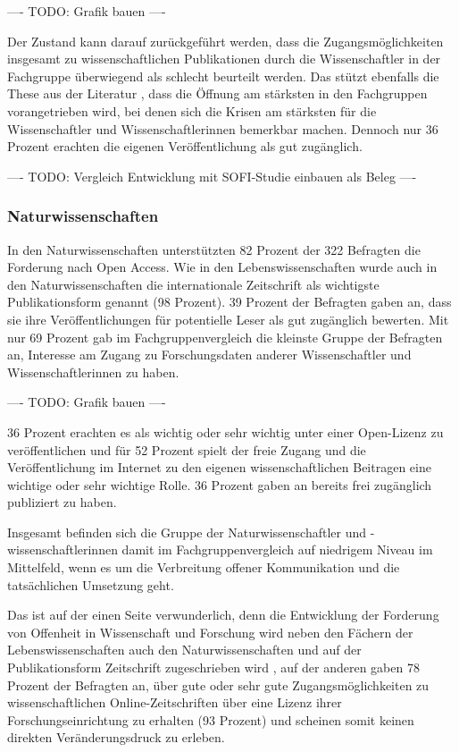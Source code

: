 ---- TODO: Grafik bauen  ----

Der Zustand kann darauf zurückgeführt werden, dass die Zugangsmöglichkeiten insgesamt zu wissenschaftlichen Publikationen durch die Wissenschaftler in der Fachgruppe überwiegend als schlecht beurteilt werden. Das stützt ebenfalls die These aus der Literatur \cite{suchen}, dass die Öffnung am stärksten in den Fachgruppen vorangetrieben wird, bei denen sich die Krisen am stärksten für die Wissenschaftler und Wissenschaftlerinnen bemerkbar machen. Dennoch nur 36 Prozent erachten die eigenen Veröffentlichung als gut zugänglich.

---- TODO: Vergleich Entwicklung mit SOFI-Studie einbauen als Beleg ----

\subsubsection{Naturwissenschaften}

In den Naturwissenschaften unterstützten 82 Prozent der 322 Befragten die Forderung nach Open Access. Wie in den Lebenswissenschaften wurde auch in den Naturwissenschaften die internationale Zeitschrift als wichtigste Publikationsform genannt (98 Prozent). 39 Prozent der Befragten gaben an, dass sie ihre Veröffentlichungen für potentielle Leser als gut zugänglich bewerten. Mit nur 69 Prozent gab im Fachgruppenvergleich die kleinste Gruppe der Befragten an, Interesse am Zugang zu Forschungsdaten anderer Wissenschaftler und Wissenschaftlerinnen zu haben.

---- TODO: Grafik bauen  ----

36 Prozent erachten es als wichtig oder sehr wichtig unter einer Open-Lizenz zu veröffentlichen und für 52 Prozent spielt der freie Zugang und die Veröffentlichung im Internet zu den eigenen wissenschaftlichen Beitragen eine wichtige oder sehr wichtige Rolle. 36 Prozent gaben an bereits frei zugänglich publiziert zu haben.

Insgesamt befinden sich die Gruppe der Naturwissenschaftler und -wissenschaftlerinnen damit im Fachgruppenvergleich auf niedrigem Niveau im Mittelfeld, wenn es um die Verbreitung offener Kommunikation und die tatsächlichen Umsetzung geht.

Das ist auf der einen Seite verwunderlich, denn die Entwicklung der Forderung von Offenheit in Wissenschaft und Forschung wird neben den Fächern der Lebenswissenschaften auch den Naturwissenschaften und auf der Publikationsform Zeitschrift zugeschrieben wird \cite{suchen}, auf der anderen gaben 78 Prozent der Befragten an, über gute oder sehr gute Zugangsmöglichkeiten zu wissenschaftlichen Online-Zeitschriften über eine Lizenz ihrer Forschungseinrichtung zu erhalten (93 Prozent) und scheinen somit keinen direkten Veränderungsdruck zu erleben.

